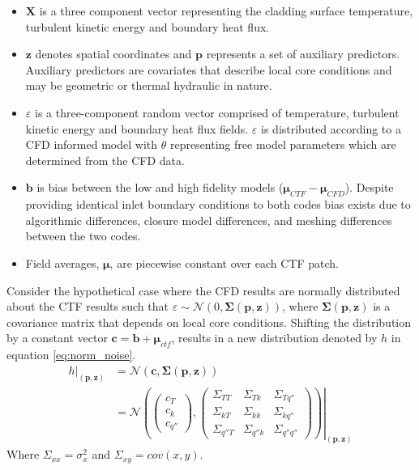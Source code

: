 \begin{itemize}
        \item $\mathbf X$ is a three component vector representing the cladding surface temperature, turbulent kinetic energy and boundary heat flux.
        \item $\mathbf z$ denotes spatial coordinates and $\mathbf p$ represents a set of auxiliary predictors.  Auxiliary predictors are covariates that describe local core conditions and may be geometric or thermal hydraulic in nature.
        \item  $\varepsilon$ is a three-component random vector comprised of temperature, turbulent kinetic energy and boundary heat flux fields.  $\varepsilon$ is distributed according to a CFD informed model with $\theta$ representing free model parameters which are determined from the CFD data. 
        \item $\bm b$ is bias between the low and high fidelity models ($\bm \mu_{CTF} - \bm \mu_{CFD}$).  Despite providing identical inlet boundary conditions to both codes bias exists due to algorithmic differences, closure model differences, and meshing differences between the two codes.
        \item Field averages, $\bm \mu$, are piecewise constant over each CTF patch.
\end{itemize}

Consider the hypothetical case where the CFD results are normally distributed about the CTF results such that $\varepsilon \sim \mathcal N(0, \bm \Sigma(\mathbf p, \mathbf z))$, where $ \bm \Sigma(\mathbf p, \mathbf z)$ is a covariance matrix that depends on local core conditions.  Shifting the distribution by a constant vector $\bm c=\bm b + \bm \mu_{ctf}$, results in a new distribution denoted by $h$ in equation \ref{eq:norm_noise}.
\begin{align}
    \left. h \right|_{(\bm p, \bm z)} & = \mathcal N(\bm c, \bm \Sigma(\mathbf p, \bm z)) \nonumber \\
    & = \left.
        \mathcal N \left(
        \begin{pmatrix}
            c_T \\
            c_k \\
            c_{q''}
        \end{pmatrix}
    ,
        \begin{pmatrix}
            \Sigma_{TT} & \Sigma_{Tk} & \Sigma_{Tq''} \\
            \Sigma_{kT} & \Sigma_{kk} & \Sigma_{kq''} \\
            \Sigma_{q''T} & \Sigma_{q''k} & \Sigma_{q''q''}
        \end{pmatrix}
    \right)
    \right|_{(\mathbf p, \mathbf z)}
\label{eq:norm_noise}
\end{align}
Where $\Sigma_{xx} = \sigma_x^2$ and $\Sigma_{xy} = cov(x,y)$.

